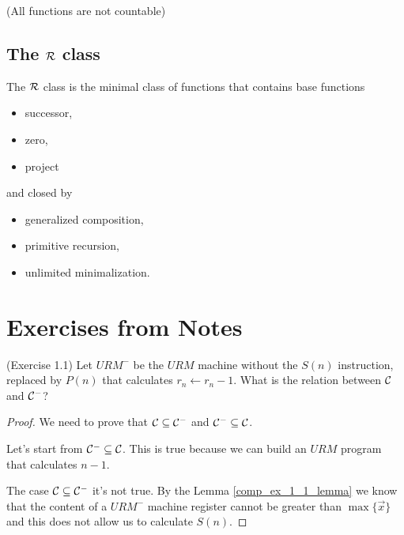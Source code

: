 \documentclass[12pt,a4paper,oneside]{book}
\begin{document}
\begin{lemma}{(All functions are not countable)}
\end{lemma}

\subsection{The  $\mathcal{R}$ class}

The $\mathcal{R}$ class is the minimal class of functions that contains base
functions
\begin{itemize}
    \item successor,
    \item zero,
    \item project
\end{itemize}
and closed by 
\begin{itemize}
    \item generalized composition,
    \item primitive recursion,
    \item unlimited minimalization.
\end{itemize}

\section{Exercises from Notes}

\begin{exercise}{(Exercise 1.1)}
    Let $URM^-$ be the $URM$ machine without the $S(n)$ instruction,
    replaced by $P(n)$ that calculates $r_n \leftarrow r_n - 1$. What
    is the relation between $\mathcal{C}$ and $\mathcal{C}^-$?
    
    \begin{proof}
        We need to prove that $\mathcal{C} \subseteq \mathcal{C}^-$ and $\mathcal{C}^-
        \subseteq \mathcal{C}$.
        
        Let's start from $\mathcal{C}^- \subseteq \mathcal{C}$. This is true
        because we can build an $URM$ program that calculates $n-1$.
        
        The case $\mathcal{C} \subseteq \mathcal{C}^-$ it's not true. By the Lemma
        \ref{comp_ex_1_1_lemma} we know that the content of a $URM^-$
        machine register cannot be greater than $\max \{ \vec{x} \}$
        and this does not allow us to calculate $S(n).$
    \end{proof}
\end{exercise}
\end{document}
